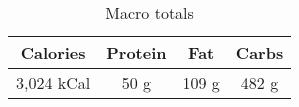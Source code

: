 \begin{multicols}{2}
\begin{enumerate}
\end{enumerate}
\begin{table}[H]
  \begin{center}
    \caption{Macro totals}
    \label{tab:table1}
    \begin{tabular}{c|c|c|c} %
      \textbf{Calories} & \textbf{Protein} & \textbf{Fat} & \textbf{Carbs}\\
      \hline
      3,024 kCal & 50 g & 109 g & 482 g\\
    \end{tabular}
  \end{center}
\end{table}
\end{multicols}



